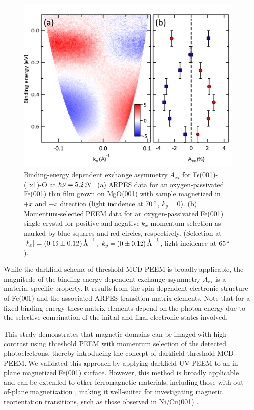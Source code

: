 \documentclass[prl,twocolumn,floatfix,superscriptaddress,aps]{revtex4-2}
\begin{document}
\begin{figure}
    \centering
    \includegraphics[width = 0.9\columnwidth]{FePaperFigARPES2.pdf}
    \caption{Binding-energy dependent exchange asymmetry $A_{\mathrm{ex}}$ for Fe(001)-(1x1)-O at $h\nu = \unit[5.2]{eV}$. (a) ARPES data for an oxygen-passivated Fe(001) thin film grown on MgO(001) with sample magnetized in $+x$ and $-x$ direction (light incidence at $\unit[70]{^{\circ}}$, $k_y = 0$). (b) Momentum-selected PEEM data for an oxygen-passivated Fe(001) single crystal for positive and negative $k_x$ momentum selection as marked by blue squares and red circles, respectively. (Selection at $|k_x| = \unit[(0.16 \pm 0.12)]{\text{\AA}^{-1}}$, $k_y = \unit[(0 \pm 0.12)]{\text{\AA}^{-1}}$, light incidence at $\unit[65]{^{\circ}}$).}
    \label{fig:AexContrast}
\end{figure}

While the darkfield scheme of threshold MCD PEEM is broadly applicable, the magnitude of the binding-energy dependent exchange asymmetry $A_{\mathrm{ex}}$ is a material-specific property. It results from the spin-dependent electronic structure of Fe(001) and the associated ARPES  transition matrix elements. Note that for a fixed binding energy these matrix elements depend on the photon energy due to 
the selective combination of the initial and final electronic states involved.

This study demonstrates that magnetic domains can be imaged with high contrast using threshold PEEM with momentum selection of the detected photoelectrons, thereby introducing the concept of darkfield threshold MCD PEEM\@. We validated this approach by applying darkfield UV PEEM to an in-plane magnetized Fe(001) surface. However, this method is broadly applicable and can be extended to other ferromagnetic materials, including those with out-of-plane magnetization \cite{kronseder2011}, making it well-suited for investigating magnetic reorientation transitions, such as those observed in Ni/Cu(001) \cite{henk1999,sander2004,nakagawa2006,kronseder2011}.
\end{document}
